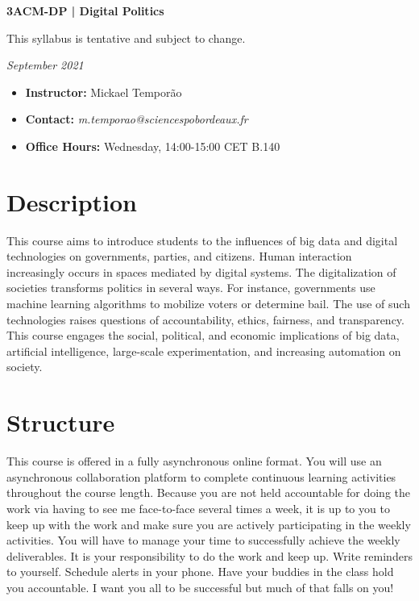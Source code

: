 \documentclass{article}
\begin{document}
\begin{center}
{\Large\textbf{3ACM-DP | Digital Politics}}

This syllabus is tentative and subject to change.

\textit{September 2021}

\end{center}

\begin{itemize}
    \item \textbf{Instructor:} Mickael Temporão
    \item \textbf{Contact:} \textit{m.temporao@sciencespobordeaux.fr}
    \item \textbf{Office Hours:} Wednesday, 14:00-15:00 CET B.140
\end{itemize}


\section*{Description}

This course aims to introduce students to the influences of big data and digital technologies on governments, parties, and citizens. Human interaction increasingly occurs in spaces mediated by digital systems. The digitalization of societies transforms politics in several ways. For instance, governments use machine learning algorithms to mobilize voters or determine bail. The use of such technologies raises questions of accountability, ethics, fairness, and transparency. This course engages the social, political, and economic implications of big data, artificial intelligence, large-scale experimentation, and increasing automation on society.

\section*{Structure}

This course is offered in a fully asynchronous online format. You will use an asynchronous collaboration platform to complete continuous learning activities throughout the course length. Because you are not held accountable for doing the work via having to see me face-to-face several times a week, it is up to you to keep up with the work and make sure you are actively participating in the weekly activities. You will have to manage your time to successfully achieve the weekly deliverables. It is your responsibility to do the work and keep up. Write reminders to yourself. Schedule alerts in your phone. Have your buddies in the class hold you accountable. I want you all to be successful but much of that falls on you!
\end{document}
